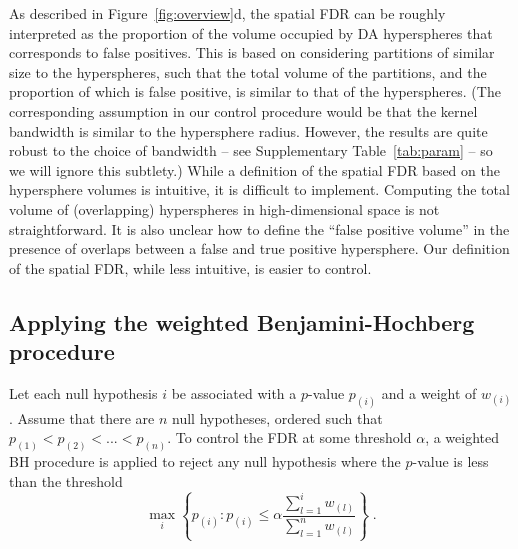 \documentclass{article}
\begin{document}
As described in Figure~\ref{fig:overview}d, the spatial FDR can be roughly interpreted as the proportion of the volume occupied by DA hyperspheres that corresponds to false positives.
This is based on considering partitions of similar size to the hyperspheres, such that the total volume of the partitions, and the proportion of which is false positive, is similar to that of the hyperspheres.
(The corresponding assumption in our control procedure would be that the kernel bandwidth is similar to the hypersphere radius.
However, the results are quite robust to the choice of bandwidth -- see Supplementary Table~\ref{tab:param} -- so we will ignore this subtlety.)
While a definition of the spatial FDR based on the hypersphere volumes is intuitive, it is difficult to implement.
Computing the total volume of (overlapping) hyperspheres in high-dimensional space is not straightforward.
It is also unclear how to define the ``false positive volume'' in the presence of overlaps between a false and true positive hypersphere.
Our definition of the spatial FDR, while less intuitive, is easier to control.

\subsection{Applying the weighted Benjamini-Hochberg procedure}
Let each null hypothesis $i$ be associated with a $p$-value $p_{(i)}$ and a weight of $w_{(i)}$.
Assume that there are $n$ null hypotheses, ordered such that $p_{(1)} < p_{(2)} < ... < p_{(n)}$.
To control the FDR at some threshold $\alpha$, a weighted BH procedure is applied \cite{benjamini1997multiple} to reject any null hypothesis where the $p$-value is less than the threshold
\[
    \max_i \left\{ p_{(i)} : p_{(i)} \le \alpha \frac{\sum_{l=1}^{i} w_{(l)}}{\sum_{l=1}^{n} w_{(l)}} \right\}  \;.
\]
\end{document}
